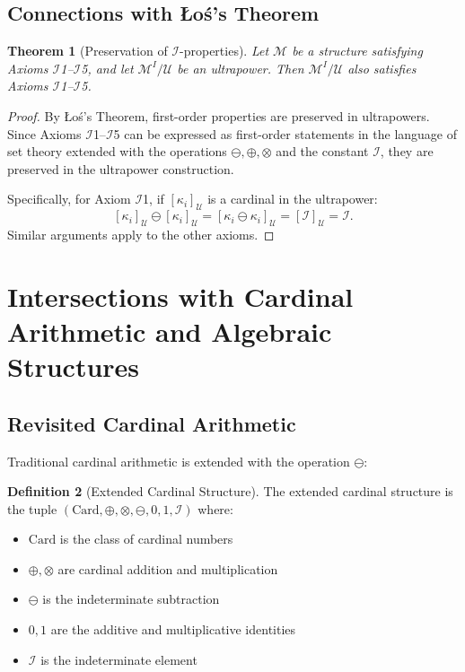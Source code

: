\documentclass[12pt,a4paper]{article}
\newtheorem{theorem}{Theorem}[section]
\theoremstyle{definition}
\newtheorem{definition}[theorem]{Definition}
\theoremstyle{remark}
\begin{document}
\subsection{Connections with Łoś's Theorem}

\begin{theorem}[Preservation of $\mathcal{I}$-properties]
Let $\mathcal{M}$ be a structure satisfying Axioms $\mathcal{I}$1--$\mathcal{I}$5, and let $\mathcal{M}^I/\mathcal{U}$ be an ultrapower. Then $\mathcal{M}^I/\mathcal{U}$ also satisfies Axioms $\mathcal{I}$1--$\mathcal{I}$5.
\end{theorem}

\begin{proof}
By Łoś's Theorem, first-order properties are preserved in ultrapowers. Since Axioms $\mathcal{I}$1--$\mathcal{I}$5 can be expressed as first-order statements in the language of set theory extended with the operations $\ominus, \oplus, \otimes$ and the constant $\mathcal{I}$, they are preserved in the ultrapower construction.

Specifically, for Axiom $\mathcal{I}$1, if $[\kappa_i]_{\mathcal{U}}$ is a cardinal in the ultrapower:
\[
[\kappa_i]_{\mathcal{U}} \ominus [\kappa_i]_{\mathcal{U}} = [\kappa_i \ominus \kappa_i]_{\mathcal{U}} = [\mathcal{I}]_{\mathcal{U}} = \mathcal{I}.
\]
Similar arguments apply to the other axioms.
\end{proof}

\section{Intersections with Cardinal Arithmetic and Algebraic Structures}

\subsection{Revisited Cardinal Arithmetic}

Traditional cardinal arithmetic is extended with the operation $\ominus$:

\begin{definition}[Extended Cardinal Structure]
The extended cardinal structure is the tuple $(\text{Card}, \oplus, \otimes, \ominus, 0, 1, \mathcal{I})$ where:
\begin{itemize}
\item $\text{Card}$ is the class of cardinal numbers
\item $\oplus, \otimes$ are cardinal addition and multiplication
\item $\ominus$ is the indeterminate subtraction
\item $0, 1$ are the additive and multiplicative identities
\item $\mathcal{I}$ is the indeterminate element
\end{itemize}
\end{definition}
\end{document}
